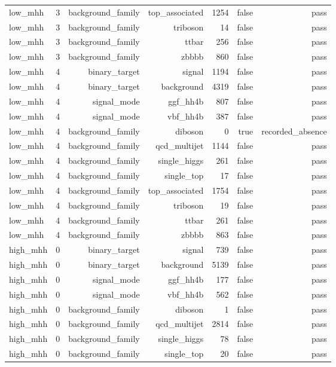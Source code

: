 \begin{table}[htbp]
{\begin{tabular}{lrrrrrr}
low\_mhh & 3 & background\_family & top\_associated & 1254 & false & pass \\
low\_mhh & 3 & background\_family & triboson & 14 & false & pass \\
low\_mhh & 3 & background\_family & ttbar & 256 & false & pass \\
low\_mhh & 3 & background\_family & zbbbb & 860 & false & pass \\
low\_mhh & 4 & binary\_target & signal & 1194 & false & pass \\
low\_mhh & 4 & binary\_target & background & 4319 & false & pass \\
low\_mhh & 4 & signal\_mode & ggf\_hh4b & 807 & false & pass \\
low\_mhh & 4 & signal\_mode & vbf\_hh4b & 387 & false & pass \\
low\_mhh & 4 & background\_family & diboson & 0 & true & recorded\_absence \\
low\_mhh & 4 & background\_family & qcd\_multijet & 1144 & false & pass \\
low\_mhh & 4 & background\_family & single\_higgs & 261 & false & pass \\
low\_mhh & 4 & background\_family & single\_top & 17 & false & pass \\
low\_mhh & 4 & background\_family & top\_associated & 1754 & false & pass \\
low\_mhh & 4 & background\_family & triboson & 19 & false & pass \\
low\_mhh & 4 & background\_family & ttbar & 261 & false & pass \\
low\_mhh & 4 & background\_family & zbbbb & 863 & false & pass \\
high\_mhh & 0 & binary\_target & signal & 739 & false & pass \\
high\_mhh & 0 & binary\_target & background & 5139 & false & pass \\
high\_mhh & 0 & signal\_mode & ggf\_hh4b & 177 & false & pass \\
high\_mhh & 0 & signal\_mode & vbf\_hh4b & 562 & false & pass \\
high\_mhh & 0 & background\_family & diboson & 1 & false & pass \\
high\_mhh & 0 & background\_family & qcd\_multijet & 2814 & false & pass \\
high\_mhh & 0 & background\_family & single\_higgs & 78 & false & pass \\
high\_mhh & 0 & background\_family & single\_top & 20 & false & pass \\

\end{tabular}}
\end{table}
